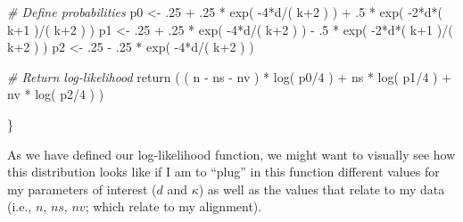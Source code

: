 \documentclass[
]{article}
\newenvironment{Shaded}{\begin{snugshade}}{\end{snugshade}}
\newcommand{\CommentTok}[1]{\textcolor[rgb]{0.56,0.35,0.01}{\textit{#1}}}
\newcommand{\DecValTok}[1]{\textcolor[rgb]{0.00,0.00,0.81}{#1}}
\newcommand{\FunctionTok}[1]{\textcolor[rgb]{0.00,0.00,0.00}{#1}}
\newcommand{\NormalTok}[1]{#1}
\newcommand{\OtherTok}[1]{\textcolor[rgb]{0.56,0.35,0.01}{#1}}
\newcommand{\SpecialCharTok}[1]{\textcolor[rgb]{0.00,0.00,0.00}{#1}}
\begin{document}
\begin{Shaded}
\begin{Highlighting}[]
  \CommentTok{\# Define probabilities}
\NormalTok{  p0 }\OtherTok{\textless{}{-}}\NormalTok{ .}\DecValTok{25} \SpecialCharTok{+}\NormalTok{ .}\DecValTok{25} \SpecialCharTok{*} \FunctionTok{exp}\NormalTok{( }\SpecialCharTok{{-}}\DecValTok{4}\SpecialCharTok{*}\NormalTok{d}\SpecialCharTok{/}\NormalTok{( k}\SpecialCharTok{+}\DecValTok{2}\NormalTok{ ) ) }\SpecialCharTok{+}\NormalTok{ .}\DecValTok{5} \SpecialCharTok{*} \FunctionTok{exp}\NormalTok{( }\SpecialCharTok{{-}}\DecValTok{2}\SpecialCharTok{*}\NormalTok{d}\SpecialCharTok{*}\NormalTok{( k}\SpecialCharTok{+}\DecValTok{1}\NormalTok{ )}\SpecialCharTok{/}\NormalTok{( k}\SpecialCharTok{+}\DecValTok{2}\NormalTok{ ) )}
\NormalTok{  p1 }\OtherTok{\textless{}{-}}\NormalTok{ .}\DecValTok{25} \SpecialCharTok{+}\NormalTok{ .}\DecValTok{25} \SpecialCharTok{*} \FunctionTok{exp}\NormalTok{( }\SpecialCharTok{{-}}\DecValTok{4}\SpecialCharTok{*}\NormalTok{d}\SpecialCharTok{/}\NormalTok{( k}\SpecialCharTok{+}\DecValTok{2}\NormalTok{ ) ) }\SpecialCharTok{{-}}\NormalTok{ .}\DecValTok{5} \SpecialCharTok{*} \FunctionTok{exp}\NormalTok{( }\SpecialCharTok{{-}}\DecValTok{2}\SpecialCharTok{*}\NormalTok{d}\SpecialCharTok{*}\NormalTok{( k}\SpecialCharTok{+}\DecValTok{1}\NormalTok{ )}\SpecialCharTok{/}\NormalTok{( k}\SpecialCharTok{+}\DecValTok{2}\NormalTok{ ) )}
\NormalTok{  p2 }\OtherTok{\textless{}{-}}\NormalTok{ .}\DecValTok{25} \SpecialCharTok{{-}}\NormalTok{ .}\DecValTok{25} \SpecialCharTok{*} \FunctionTok{exp}\NormalTok{( }\SpecialCharTok{{-}}\DecValTok{4}\SpecialCharTok{*}\NormalTok{d}\SpecialCharTok{/}\NormalTok{( k}\SpecialCharTok{+}\DecValTok{2}\NormalTok{ ) )}

  \CommentTok{\# Return log{-}likelihood}
  \FunctionTok{return}\NormalTok{ ( ( n }\SpecialCharTok{{-}}\NormalTok{ ns }\SpecialCharTok{{-}}\NormalTok{ nv ) }\SpecialCharTok{*} \FunctionTok{log}\NormalTok{( p0}\SpecialCharTok{/}\DecValTok{4}\NormalTok{ ) }\SpecialCharTok{+}
\NormalTok{            ns }\SpecialCharTok{*} \FunctionTok{log}\NormalTok{( p1}\SpecialCharTok{/}\DecValTok{4}\NormalTok{ ) }\SpecialCharTok{+}\NormalTok{ nv }\SpecialCharTok{*} \FunctionTok{log}\NormalTok{( p2}\SpecialCharTok{/}\DecValTok{4}\NormalTok{ ) )}

\NormalTok{\}}
\end{Highlighting}
\end{Shaded}

As we have defined our log-likelihood function, we might want to
visually see how this distribution looks like if I am to ``plug'' in
this function different values for my parameters of interest (\(d\) and
\(\kappa\)) as well as the values that relate to my data (i.e., \(n\),
\(ns\), \(nv\); which relate to my alignment).
\end{document}

